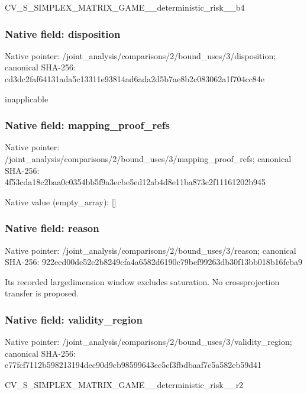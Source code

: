\documentclass[10pt,a4paper]{article}
\begin{document}
CV\_S\_SIMPLEX\_MATRIX\_GAME\allowbreak{}\_\_deterministic\_risk\_\_b4


\subsubsection{Native field: disposition}


Native pointer: /joint\_analysis/comparis\allowbreak{}ons/2/bound\_uses/3/dispo\allowbreak{}sition; canonical SHA-256: cd3dc2faf64131ada5c13311\allowbreak{}e93814ad6ada2d5b7ae8b2c0\allowbreak{}83062a1f704cc84e


inapplicable


\subsubsection{Native field: mapping\_proof\_refs}


Native pointer: /joint\_analysis/comparis\allowbreak{}ons/2/bound\_uses/3/mappi\allowbreak{}ng\_proof\_refs; canonical SHA-256: 4f53cda18c2baa0c0354bb5f\allowbreak{}9a3ecbe5ed12ab4d8e11ba87\allowbreak{}3c2f11161202b945



Native value (empty\_array): []



\subsubsection{Native field: reason}


Native pointer: /joint\_analysis/comparis\allowbreak{}ons/2/bound\_uses/3/reaso\allowbreak{}n; canonical SHA-256: 922ecd00de52e2b8249cfa4a\allowbreak{}6582d6190c79bef99263db30\allowbreak{}f13bb018b16feba9


Its recorded largedimension window excludes saturation. No crossprojection transfer is proposed.


\subsubsection{Native field: validity\_region}


Native pointer: /joint\_analysis/comparis\allowbreak{}ons/2/bound\_uses/3/valid\allowbreak{}ity\_region; canonical SHA-256: e77fcf7112b598213194dec9\allowbreak{}0d9cb98599643ec5cf3fbdba\allowbreak{}af7c5a582eb59d41


CV\_S\_SIMPLEX\_MATRIX\_GAME\allowbreak{}\_\_deterministic\_risk\_\_r2
\end{document}

